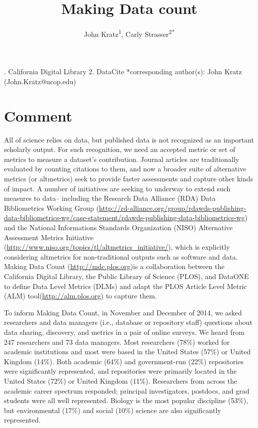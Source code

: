 \documentclass[english]{article}
\begin{document}
\title{Making Data count}


\author{John Kratz\textsuperscript{1}, Carly
Strasser\textsuperscript{2{*}}}

. California Digital Library 2. DataCite {*}corresponding author(s):
John Kratz (John.Kratz@ucop.edu)


\section*{Comment}


All of science relies on data, but published data is not recognized as an important scholarly output.
For such recognition, we need an accepted metric or set of metrics to measure a dataset's contribution.
Journal articles are traditionally evaluated by counting citations to them, and now a broader suite of alternative metrics (or altmetrics) seek to provide faster assessments and capture other kinds of impact.
A number of initiatives are seeking to underway to extend such measures to data-- including the Research Data Alliance (RDA) Data Bibliometrics Working Group (\url{http://rd-alliance.org/group/rdawds-publishing-data-bibliometrics-wg/case-statement/rdawds-publishing-data-bibliometrics-wg}{}) and the National Informations Standards Organization (NISO) Alternative Assessment Metrics Initiative (\url{http://www.niso.org/topics/tl/altmetrics_initiative/}), which is explicitly considering altmetrics for non-traditional outputs such as software and data.
Making Data Count (\url{http://mdc.plos.org})is a collaboration between the California Digital Library, the Public Library of Science (PLOS), and DataONE to define Data Level Metrics (DLMs) and adapt the PLOS Article Level Metric (ALM) tool(\url{http://alm.plos.org}) to capture them.


To inform Making Data Count, in November and December of 2014, we asked researchers and data managers (i.e., database or repository staff) questions about data sharing, discovery, and metrics in a pair of online surveys.
We heard from 247 researchers and 73 data managers.
Most researchers (78\%) worked for academic institutions and most were based in the United States (57\%) or United Kingdom (14\%).
Both academic (64\%) and government-run (22\%) repositories were significantly represented, and repositories were primarily located in the United States (72\%) or United Kingdom (11\%).
Researchers from across the academic career spectrum responded; principal investigators, postdocs, and grad students were all well represented. 
Biology is the most popular discipline (53\%), but environmental (17\%) and social (10\%) science are also significantly represented. 
\end{document}
